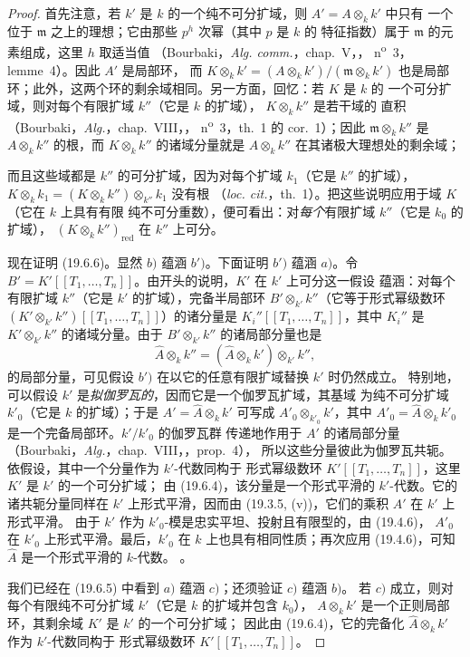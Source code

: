 \begin{proof}
首先注意，若 $k'$ 是 $k$ 的一个纯不可分扩域，则 $A'=A\otimes_k k'$ 中只有
一个位于 $\mathfrak m$ 之上的理想；它由那些 $p^h$ 次幂（其中 $p$ 是 $k$ 的
特征指数）属于 $\mathfrak m$ 的元素组成，这里 $h$ 取适当值
（Bourbaki，\emph{Alg. comm.}，chap.~V，，
n\textsuperscript{o}~3，lemme~4）。因此 $A'$ 是局部环，
而
$K\otimes_k k'=(A\otimes_k k')/(\mathfrak m\otimes_k k')$
也是局部环；此外，这两个环的剩余域相同。另一方面，回忆：若 $K$ 是 $k$ 的
一个可分扩域，则对每个有限扩域 $k''$（它是 $k$ 的扩域），
$K\otimes_k k''$ 是若干域的
直积（Bourbaki，\emph{Alg.}，chap.~VIII，，
n\textsuperscript{o}~3，th.~1 的 cor.~1）；因此
$\mathfrak m\otimes_k k''$ 是 $A\otimes_k k''$ 的根，而
$K\otimes_k k''$ 的诸域分量就是 $A\otimes_k k''$ 在其诸极大理想处的剩余域；


而且这些域都是 $k''$ 的可分扩域，因为对每个扩域 $k_1$（它是 $k''$ 的扩域），
$K\otimes_k k_1=(K\otimes_k k'')\otimes_{k''}k_1$ 没有根
（\emph{loc. cit.}，th.~1）。把这些说明应用于域 $K$（它在 $k$ 上具有有限
纯不可分重数），便可看出：对\emph{每个}有限扩域 $k''$（它是 $k_0$ 的扩域），
$(K\otimes_k k'')_{\mathrm{red}}$ 在 $k''$ 上可分。

现在证明 (19.6.6)。显然 $b)$ 蕴涵 $b')$。下面证明 $b')$ 蕴涵 $a)$。令
$B'=K'[[T_1,\ldots,T_n]]$。由开头的说明，$K'$ 在 $k'$ 上可分这一假设
蕴涵：对每个有限扩域 $k''$（它是 $k'$ 的扩域），完备半局部环
$B'\otimes_{k'}k''$（它等于形式幂级数环
$(K'\otimes_{k'}k'')[[T_1,\ldots,T_n]]$）的诸分量是
$K_i''[[T_1,\ldots,T_n]]$，其中 $K_i''$ 是
$K'\otimes_{k'}k''$ 的诸域分量。由于 $B'\otimes_{k'}k''$ 的诸局部分量也是
\[
  \widehat A\otimes_k k''
  =(\widehat A\otimes_k k')\otimes_{k'}k'',
\]
的局部分量，可见假设 $b')$ 在以它的任意有限扩域替换 $k'$ 时仍然成立。
特别地，可以假设 $k'$ 是\emph{拟伽罗瓦的}，因而它是一个伽罗瓦扩域，其基域
为纯不可分扩域 $k'_0$（它是 $k$ 的扩域）；于是
$A'=\widehat A\otimes_k k'$ 可写成
$A'_0\otimes_{k'_0}k'$，其中
$A'_0=\widehat A\otimes_k k'_0$ 是一个完备局部环。$k'/k'_0$ 的伽罗瓦群
传递地作用于 $A'$ 的诸局部分量
（Bourbaki，\emph{Alg.}，chap.~VIII，，prop.~4），
所以这些分量彼此为伽罗瓦共轭。依假设，其中一个分量作为 $k'$-代数同构于
形式幂级数环 $K'[[T_1,\ldots,T_n]]$，这里 $K'$ 是 $k'$ 的一个可分扩域；
由 (19.6.4)，该分量是一个形式平滑的 $k'$-代数。它的诸共轭分量同样在
$k'$ 上形式平滑，因而由 (19.3.5, (v))，它们的乘积 $A'$ 在 $k'$ 上形式平滑。
由于 $k'$ 作为 $k'_0$-模是忠实平坦、投射且有限型的，由 (19.4.6)，
$A'_0$ 在 $k'_0$ 上形式平滑。最后，$k'_0$ 在 $k$ 上也具有相同性质；再次应用
(19.4.6)，可知 $\widehat A$ 是一个形式平滑的 $k$-代数。
。

我们已经在 (19.6.5) 中看到 $a)$ 蕴涵 $c)$；还须验证 $c)$ 蕴涵 $b)$。
若 $c)$ 成立，则对每个有限纯不可分扩域 $k'$（它是 $k$ 的扩域并包含 $k_0$），
$A\otimes_k k'$ 是一个正则局部环，其剩余域 $K'$ 是 $k'$ 的一个可分扩域；
因此由 (19.6.4)，它的完备化 $\widehat A\otimes_k k'$ 作为 $k'$-代数同构于
形式幂级数环 $K'[[T_1,\ldots,T_n]]$。
\end{proof}

